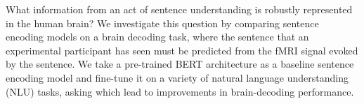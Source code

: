 What information from an act of sentence understanding is robustly represented in the human brain? We investigate this question by comparing sentence encoding models on a brain decoding task, where the sentence that an experimental participant has seen must be predicted from the fMRI signal evoked by the sentence. We take a pre-trained BERT architecture as a baseline sentence encoding model and fine-tune it on a variety of natural language understanding (NLU) tasks, asking which lead to improvements in brain-decoding performance.